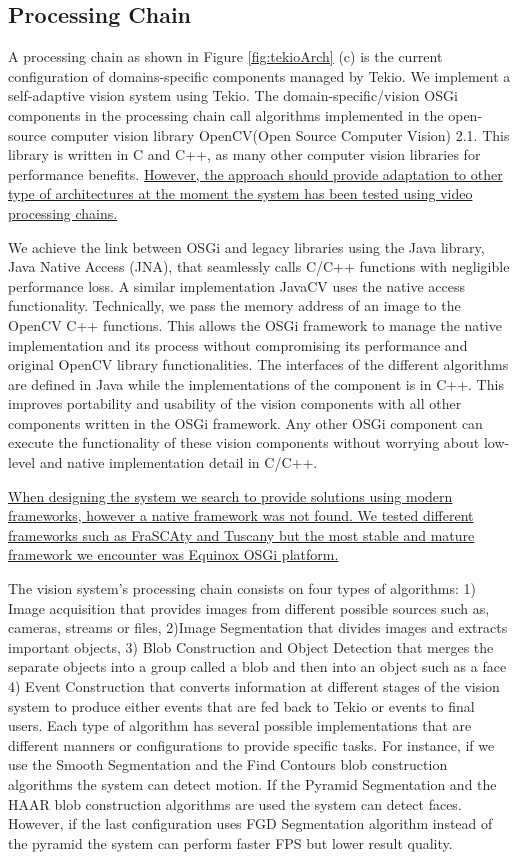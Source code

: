 \documentclass{acm_proc_article-sp}
\begin{document}
\subsection{Processing Chain}
\label{sec:sec:chainTekio}
A processing chain as shown in Figure \ref{fig:tekioArch} (c)  is the current configuration of domains-specific components managed by Tekio. We implement a self-adaptive vision system using Tekio. The domain-specific/vision OSGi components in the processing chain call algorithms implemented in the open-source computer vision library OpenCV(Open Source Computer Vision) 2.1. This library is written in C and C++, as many other computer vision libraries for performance benefits. \underline{However, the approach should provide adaptation to other type of architectures at the moment the system has been tested using video processing chains.}

We achieve the link between OSGi and legacy libraries using the Java library, Java Native Access (JNA), that seamlessly calls C/C++ functions with negligible performance loss. 
A similar implementation  JavaCV \cite{javacv} uses the native access functionality. Technically,  we pass the memory address of an image to the OpenCV C++ functions. This allows  the OSGi framework to manage the native implementation and its process without compromising its performance and original OpenCV library functionalities. The interfaces of the different algorithms are defined in Java while the implementations of the component is in C++. This improves portability and usability of the vision components with  all other components written in the OSGi framework. Any other OSGi component can execute the functionality of these vision components without worrying about low-level and native implementation detail in C/C++. 

\underline{When designing the system we search to provide solutions using modern frameworks, however a native framework was not found. We tested different frameworks such as FraSCAty and Tuscany but the most stable and mature framework we encounter was Equinox OSGi platform.}

The vision system's processing chain consists on four types of algorithms: 1) Image acquisition that provides images from different possible sources such as, cameras, streams or files, 2)Image Segmentation that divides images and extracts important objects, 3) Blob Construction and Object Detection that merges the separate objects  into a group called a blob and then into an object such as a face 4) Event  Construction that converts information at different stages of the vision system to produce either events that are fed back to Tekio or events to final users. Each type of algorithm has several possible implementations that are  different manners or configurations to provide specific tasks. For instance, if we use the Smooth Segmentation and the Find Contours blob construction algorithms the system can detect motion. If the Pyramid Segmentation and the HAAR blob construction algorithms are used the system can detect faces. However, if the last configuration uses FGD Segmentation algorithm instead of the pyramid the system can perform faster FPS but lower result quality.
\end{document}
